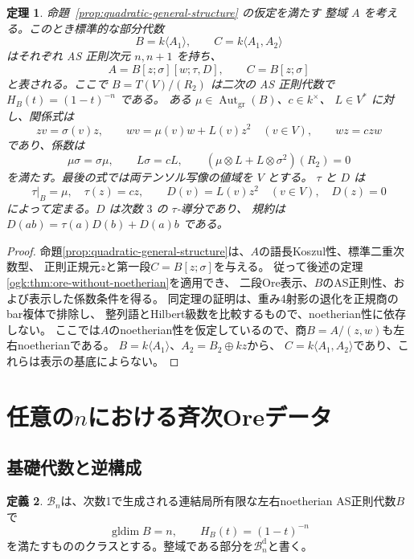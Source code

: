 \documentclass[11pt,a4paper]{ltjsarticle}
\newtheorem{theorem}{定理}[section]
\theoremstyle{definition}
\newtheorem{definition}[theorem]{定義}
\newcommand{\gldim}{\operatorname{gldim}}
\newcommand{\Bclass}{\mathcal B}
\begin{document}
\begin{theorem}\label{thm:quadratic-all-ones}
命題~\ref{prop:quadratic-general-structure} の仮定を満たす
整域 $A$ を考える。このとき標準的な部分代数
\[
 B=k\langle A_1\rangle,\qquad C=k\langle A_1,A_2\rangle
\]
はそれぞれ AS 正則次元 $n,n+1$ を持ち、
\begin{equation}\label{eq:quadratic-all-ones-ore}
 A=B[z;\sigma][w;\tau,D],\qquad C=B[z;\sigma]
\end{equation}
と表される。ここで $B=T(V)/(R_2)$ は二次の AS 正則代数で
$H_B(t)=(1-t)^{-n}$ である。
ある $\mu\in\operatorname{Aut}_{\mathrm{gr}}(B)$、$c\in k^\times$、
$L\in V^*$ に対し、関係式は
\begin{equation}\label{eq:quadratic-all-ones-normal-form}
 zv=\sigma(v)z,\qquad
 wv=\mu(v)w+L(v)z^2\quad(v\in V),\qquad wz=c zw
\end{equation}
であり、係数は
\begin{equation}\label{eq:quadratic-all-ones-conditions}
 \mu\sigma=\sigma\mu,\qquad
 L\sigma=cL,\qquad
 (\mu\otimes L+L\otimes\sigma^2)(R_2)=0
\end{equation}
を満たす。最後の式では両テンソル写像の値域を $V$ とする。
$\tau$ と $D$ は
\[
 \tau|_B=\mu,\quad\tau(z)=cz,\qquad
 D(v)=L(v)z^2\quad(v\in V),\quad D(z)=0
\]
によって定まる。$D$ は次数 $3$ の $\tau$-導分であり、
規約は $D(ab)=\tau(a)D(b)+D(a)b$ である。

\end{theorem}

\begin{proof}
命題\ref{prop:quadratic-general-structure}は、$A$の語長Koszul性、標準二重次数型、
正則正規元$z$と第一段$C=B[z;\sigma]$を与える。
従って後述の定理\ref{ogk:thm:ore-without-noetherian}を適用でき、
二段Ore表示、$B$のAS正則性、および表示した係数条件を得る。
同定理の証明は、重み4射影の退化を正規商のbar複体で排除し、
整列語とHilbert級数を比較するもので、noetherian性に依存しない。
ここでは$A$のnoetherian性を仮定しているので、商$B=A/(z,w)$も左右noetherianである。
$B=k\langle A_1\rangle$、$A_2=B_2\oplus kz$から、
$C=k\langle A_1,A_2\rangle$であり、これらは表示の基底によらない。
\end{proof}

\section{任意の\texorpdfstring{$n$}{n}における斉次Oreデータ}\label{sec:general-ore-data}
\subsection{基礎代数と逆構成}
\begin{definition}\label{def:base-class}
$\Bclass_n$は、次数1で生成される連結局所有限な左右noetherian AS正則代数$B$で
\[
\gldim B=n,\qquad H_B(t)=(1-t)^{-n}
\]
を満たすもののクラスとする。整域である部分を$\Bclass_n^{\mathrm d}$と書く。
\end{definition}
\end{document}
